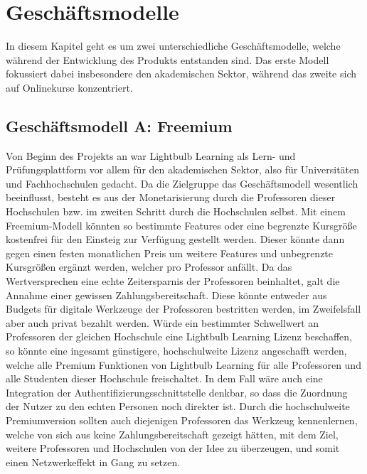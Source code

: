 \chapter{Geschäftsmodelle}

In diesem Kapitel geht es um zwei unterschiedliche Geschäftsmodelle, welche während der Entwicklung des Produkts entstanden sind. Das erste Modell fokussiert dabei insbesondere den akademischen Sektor, während das zweite sich auf Onlinekurse konzentriert.

\section{Geschäftsmodell A: Freemium}
Von Beginn des Projekts an war Lightbulb Learning als Lern- und Prüfungsplattform vor allem für den akademischen Sektor, also für Universitäten und Fachhochschulen gedacht. Da die Zielgruppe das Geschäftsmodell wesentlich beeinflusst, besteht es aus der Monetarisierung durch die Professoren dieser Hochschulen bzw. im zweiten Schritt durch die Hochschulen selbst. Mit einem Freemium-Modell könnten so bestimmte Features oder eine begrenzte Kursgröße kostenfrei für den Einsteig zur Verfügung gestellt werden. Dieser könnte dann gegen einen festen monatlichen Preis um weitere Features und unbegrenzte Kursgrößen ergänzt werden, welcher pro Professor anfällt. Da das Wertversprechen eine echte Zeitersparnis der Professoren beinhaltet, galt die Annahme einer gewissen Zahlungsbereitschaft. Diese könnte entweder aus Budgets für digitale Werkzeuge der Professoren bestritten werden, im Zweifelsfall aber auch privat bezahlt werden. Würde ein bestimmter Schwellwert an Professoren der gleichen Hochschule eine Lightbulb Learning Lizenz beschaffen, so könnte eine ingesamt günstigere, hochschulweite Lizenz angeschafft werden, welche alle Premium Funktionen von Lightbulb Learning für alle Professoren und alle Studenten dieser Hochschule freischaltet. In dem Fall wäre auch eine Integration der Authentifizierungsschnittstelle denkbar, so dass die Zuordnung der Nutzer zu den echten Personen noch direkter ist. Durch die hochschulweite Premiumversion sollten auch diejenigen Professoren das Werkzeug kennenlernen, welche von sich aus keine Zahlungsbereitschaft gezeigt hätten, mit dem Ziel, weitere Professoren und Hochschulen von der Idee zu überzeugen, und somit einen Netzwerkeffekt in Gang zu setzen.

